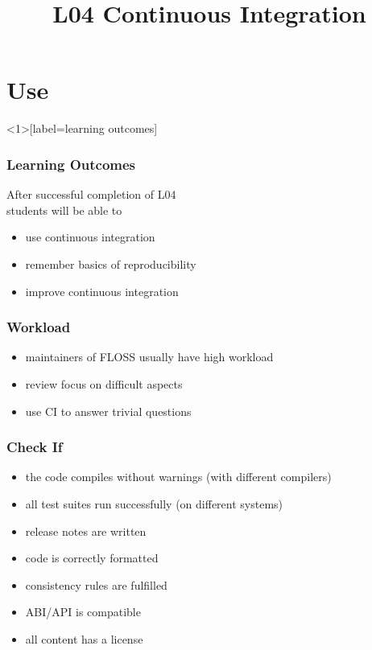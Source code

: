 

\title{L04 Continuous Integration}



\section{Use}

\begin{frame}<1>[label=learning outcomes]
	\frametitle{Learning Outcomes}
	After successful completion of L04 \\
	students will be able to

	\begin{itemize}
	\item use continuous integration
	\item remember basics of reproducibility
	\item improve continuous integration
	\end{itemize}
\end{frame}

\begin{frame}
	\frametitle{Workload}

	\begin{itemize}[<+-| alert@+>]
	\item maintainers of FLOSS usually have high workload
	\item review focus on difficult aspects
	\item use CI to answer trivial questions
	\end{itemize}
\end{frame}

\begin{frame}
	\frametitle{Check If}

	\begin{itemize}[<+-| alert@+>]
	\item the code compiles without warnings (with different compilers)
	\item all test suites run successfully (on different systems)
	\item release notes are written
	\item code is correctly formatted
	\item consistency rules are fulfilled
	\item ABI/API is compatible
	\item all content has a license
	\end{itemize}
\end{frame}

